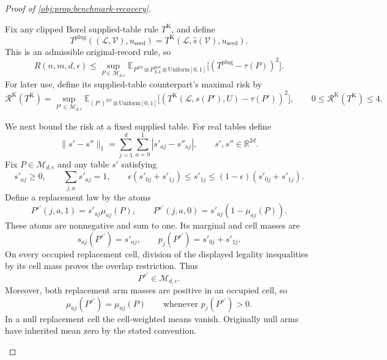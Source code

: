 \begin{proof}[Proof of \cref{obj:prop:benchmark-recovery}]
\begin{enumerate}
Fix any clipped Borel supplied-table rule \(T^{\mathrm K}\), and define
\[
T^{\mathrm{plug}}((\mathcal L,\mathcal V),u_{\mathrm{seed}})
=
T^{\mathrm K}(\mathcal L,\widehat s(\mathcal V),u_{\mathrm{seed}}).
\]
This is an admissible original-record rule, so
\[
R(n,m,d,\epsilon)
\le
\sup_{P\in\mathcal M_{d,\epsilon}}
\mathbb E_{P^{\otimes n}\otimes P_{XA}^{\otimes m}
\otimes\mathrm{Uniform}[0,1]}
\bigl[(T^{\mathrm{plug}}-\tau(P))^2\bigr].
\]
For later use, define its supplied-table counterpart's maximal risk by
\[
\mathscr R^{\mathrm K}(T^{\mathrm K})
=
\sup_{P'\in\mathcal M_{d,\epsilon}}
\mathbb E_{(P')^{\otimes n}\otimes\mathrm{Uniform}[0,1]}
\bigl[
(T^{\mathrm K}(\mathcal L,s(P'),U)-\tau(P'))^2
\bigr],
\qquad
0\le\mathscr R^{\mathrm K}(T^{\mathrm K})\le4.
\]

We next bound the risk at a fixed supplied table. For real tables define
\[
\|s'-s''\|_1=\sum_{j=1}^d\sum_{a=0}^1|s'_{aj}-s''_{aj}|,
\qquad s',s''\in\mathbb R^{2d}.
\]
Fix \(P\in\mathcal M_{d,\epsilon}\) and any table \(s'\) satisfying
\[
s'_{aj}\ge0,\qquad \sum_{j,a}s'_{aj}=1,\qquad
\epsilon(s'_{0j}+s'_{1j})\le s'_{1j}
\le(1-\epsilon)(s'_{0j}+s'_{1j}).
\]
Define a replacement law by the atoms
\[
P^{s'}(j,a,1)=s'_{aj}\mu_{aj}(P),
\qquad
P^{s'}(j,a,0)=s'_{aj}(1-\mu_{aj}(P)).
\]
These atoms are nonnegative and sum to one. Its marginal and cell masses are
\[
s_{aj}(P^{s'})=s'_{aj},
\qquad
p_j(P^{s'})=s'_{0j}+s'_{1j}.
\]
On every occupied replacement cell, division of the displayed legality inequalities by its cell mass proves the overlap restriction. Thus
\[
P^{s'}\in\mathcal M_{d,\epsilon}.
\]
Moreover, both replacement arm masses are positive in an occupied cell, so
\[
\mu_{aj}(P^{s'})=\mu_{aj}(P)
\qquad\text{whenever }p_j(P^{s'})>0.
\]
In a null replacement cell the cell-weighted means vanish. Originally null arms have inherited mean zero by the stated convention.


\end{enumerate}
\end{proof}
